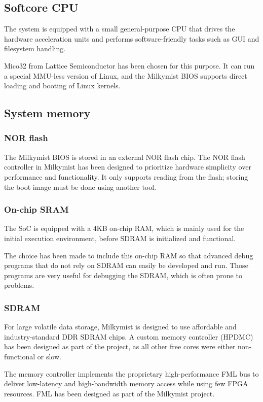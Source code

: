 \documentclass[a4paper,11pt]{article}
\begin{document}
\subsection{Softcore CPU}
The system is equipped with a small general-purpose CPU that drives the hardware acceleration units and performs software-friendly tasks such as GUI and filesystem handling.

Mico32 from Lattice Semiconductor has been chosen for this purpose. It can run a special MMU-less version of Linux, and the Milkymist BIOS supports direct loading and booting of Linux kernels.

\subsection{System memory}
\subsubsection{NOR flash}
The Milkymist BIOS is stored in an external NOR flash chip. The NOR flash controller in Milkymist has been designed to prioritize hardware simplicity over performance and functionality. It only supports reading from the flash; storing the boot image must be done using another tool.

\subsubsection{On-chip SRAM}
The SoC is equipped with a 4KB on-chip RAM, which is mainly used for the initial execution environment, before SDRAM is initialized and functional.

The choice has been made to include this on-chip RAM so that advanced debug programs that do not rely on SDRAM can easily be developed and run. Those programs are very useful for debugging the SDRAM, which is often prone to problems.

\subsubsection{SDRAM}
For large volatile data storage, Milkymist is designed to use affordable and industry-standard DDR SDRAM chips. A custom memory controller (HPDMC) has been designed as part of the project, as all other free cores were either non-functional or slow.

The memory controller implements the proprietary high-performance FML bus to deliver low-latency and high-bandwidth memory access while using few FPGA resources. FML has been designed as part of the Milkymist project.
\end{document}
